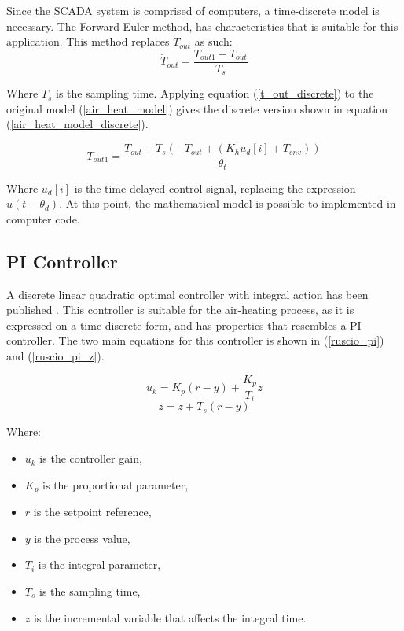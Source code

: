 \documentclass[conference]{IEEEtran}
\begin{document}
Since the SCADA system is comprised of computers, a time-discrete model is necessary. The Forward Euler method, has characteristics that is suitable for this application. This method replaces $\dot{T}_{out}$ as such:
\begin{equation}
    \label{t_out_discrete}
    \dot{T}_{out} = \frac{T_{out1} - T_{out}}{T_s}
\end{equation}

Where $T_s$ is the sampling time. Applying equation (\ref{t_out_discrete}) to the original model (\ref{air_heat_model}) gives the discrete version shown in equation (\ref{air_heat_model_discrete}).

\begin{equation}
    \label{air_heat_model_discrete}
    T_{out1} = \frac{T_{out} + T_s\left(-T_{out} + \left(K_h u_d[i] + T_{env}\right)\right)}{\theta_t}
\end{equation}

Where $u_d[i]$ is the time-delayed control signal, replacing the expression $u(t-\theta_d)$. At this point, the mathematical model is possible to implemented in computer code.

\subsection{PI Controller}
A discrete linear quadratic optimal controller with integral action has been published \cite{ruscio_2012_discrete}. This controller is suitable for the air-heating process, as it is expressed on a time-discrete form, and has properties that resembles a PI controller. The two main equations for this controller is shown in (\ref{ruscio_pi}) and (\ref{ruscio_pi_z}). 

\begin{equation}
    \label{ruscio_pi}
    u_k = K_p (r - y) + \frac{K_p}{T_i}z
\end{equation}
\begin{equation}
    \label{ruscio_pi_z}
    z = z + T_s (r - y)
\end{equation}

Where:
\begin{itemize}
    \item[] $u_k$ is the controller gain,
    \item[] $K_p$ is the proportional parameter,
    \item[] $r$ is the setpoint reference,
    \item[] $y$ is the process value,
    \item[] $T_i$ is the integral parameter,
    \item[] $T_s$ is the sampling time,
    \item[] $z$ is the incremental variable that affects the integral time.
\end{itemize}
\end{document}

